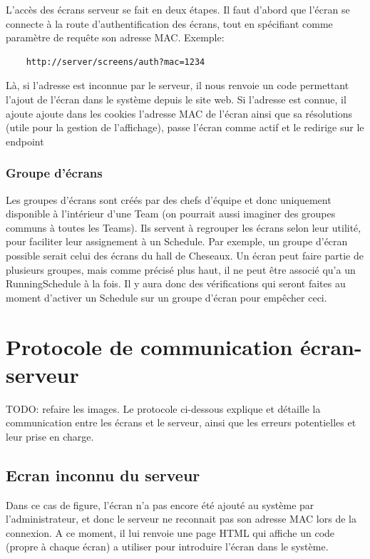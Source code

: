 \documentclass[french]{article}
\begin{document}
L'accès des écrans serveur se fait en deux étapes. Il faut d'abord que l'écran se connecte à la route d'authentification des écrans, tout en spécifiant 
comme paramètre de requête son adresse MAC. Exemple:
\begin{verbatim}
	http://server/screens/auth?mac=1234
\end{verbatim}

Là, si l'adresse est inconnue par le serveur, il nous renvoie un code permettant l'ajout de l'écran dans le système depuis le site web. Si l'adresse est connue, il ajoute ajoute dans les cookies l'adresse MAC de l'écran ainsi que sa résolutions (utile pour la gestion de l'affichage), passe l'écran comme actif et le redirige sur le endpoint

\subsubsection{Groupe d'écrans}
Les groupes d'écrans sont créés par des chefs d'équipe et donc uniquement disponible à l'intérieur d'une Team (on pourrait aussi imaginer des groupes communs à toutes les Teams). Ils servent à regrouper les écrans selon leur utilité, pour faciliter leur assignement à un Schedule. Par exemple, un groupe d'écran possible serait celui des écrans du hall de Cheseaux. \newline
Un écran peut faire partie de plusieurs groupes, mais comme précisé plus haut, il ne peut être associé qu'a un RunningSchedule à la fois. Il y aura donc des vérifications qui seront faites au moment d'activer un Schedule sur un groupe d'écran pour empêcher ceci.

\newpage

		
\section{Protocole de communication écran-serveur}
TODO: refaire les images.\newline
	Le protocole ci-dessous explique et détaille la communication entre les écrans et le serveur, ainsi que les erreurs potentielles et leur prise en charge. 
	
\subsection{Ecran inconnu du serveur}
	Dans ce cas de figure, l'écran n'a pas encore été ajouté au système par l'administrateur, et donc le serveur ne reconnait pas son adresse MAC lors de la connexion. A ce moment, il lui renvoie une page HTML qui affiche un code (propre à chaque écran) a utiliser pour introduire l'écran dans le système.
	
\end{document}
